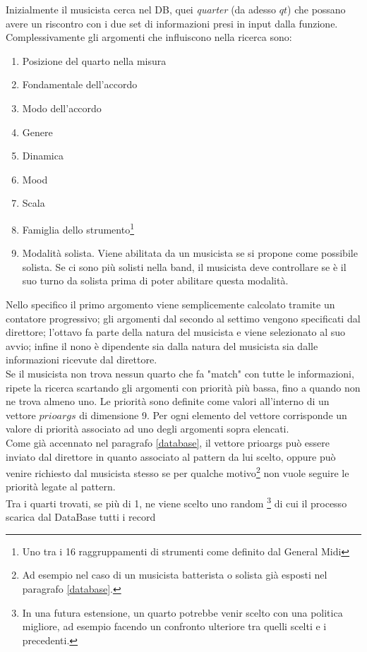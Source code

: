 Inizialmente il musicista cerca nel DB, quei \emph{quarter} (da adesso
$qt$) che possano
avere un riscontro con i due set di informazioni presi in input dalla
funzione. Complessivamente gli argomenti che influiscono nella ricerca
sono:
\begin{enumerate}
\item Posizione del quarto nella misura
\item Fondamentale dell'accordo
\item Modo dell'accordo
\item Genere
\item Dinamica
\item Mood
\item Scala
\item Famiglia dello strumento\footnote{Uno tra i 16 raggruppamenti
di strumenti come definito dal General
Midi} %
\item Modalità solista. Viene abilitata da un musicista se si propone come
possibile solista. Se ci sono più solisti nella band, il musicista deve
controllare se è il suo turno da solista prima di poter abilitare questa
modalità.
\end{enumerate}
Nello specifico il primo argomento viene semplicemente calcolato tramite un
contatore progressivo; gli argomenti dal secondo al settimo vengono
specificati dal direttore; l'ottavo fa parte della natura del musicista
e viene selezionato al suo avvio; infine il nono è dipendente sia dalla
natura del musicista sia dalle informazioni ricevute dal direttore.\\
Se il musicista non trova nessun quarto che fa "match" con tutte le
informazioni, ripete la ricerca scartando
gli argomenti con priorità più bassa, fino a quando non ne trova almeno
uno. Le priorità sono definite come valori all'interno di un vettore
$prioargs$ di dimensione 9. Per ogni elemento del vettore corrisponde un valore di priorità
associato ad uno degli argomenti sopra elencati.\\
Come già accennato nel paragrafo \ref{database}, il vettore prioargs può
essere inviato dal direttore in quanto associato al pattern da lui
scelto, oppure può venire richiesto dal musicista
stesso se per qualche motivo\footnote{Ad esempio nel caso di un
musicista batterista o solista già esposti nel paragrafo \ref{database}.} 
non vuole seguire le priorità legate al pattern.\\
Tra i quarti trovati, se più di 1, ne viene scelto uno random
\footnote{In una futura estensione, un quarto potrebbe venir scelto con
una politica migliore, ad esempio facendo un confronto ulteriore tra quelli
scelti e i precedenti.} di cui il processo scarica dal DataBase tutti i record
